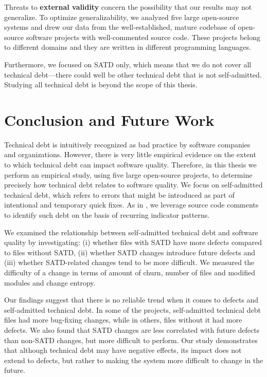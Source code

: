 Threats  to {\bf external validity} concern the possibility that our results may not generalize. To optimize generalizability, we analyzed five large open-source systems and drew our data from the well-established, mature codebase of open-source software projects with well-commented source code. These projects belong to different domains and they are written in different programming languages.


Furthermore, we focused on SATD only, which means that we do not cover all technical debt---there could well be other technical debt that is not self-admitted. Studying all technical debt is beyond the scope of this thesis.





\section{Conclusion and Future Work}
\label{chap3:sec:conclusion}



Technical debt is intuitively recognized as bad practice by software companies and organizations. However, there is very little empirical evidence on the extent to which technical debt can impact software quality. Therefore, in this thesis we perform an empirical study, using five large open-source projects, to determine precisely how technical debt relates to software quality. We focus on self-admitted technical debt, which refers to  errors that might be introduced as part of intentional and temporary quick fixes. As in  \cite{ICSM_PotdarS14}, we leverage source code comments to identify such debt on the basis of recurring indicator patterns.


We examined the relationship between self-admitted technical debt and software quality by investigating: (i) whether files with SATD have more defects compared to files without SATD, (ii) whether SATD changes introduce future defects and (iii) whether SATD-related changes tend to be more difficult. We measured the difficulty of a change in terms of amount of churn, number of files and modified modules and change entropy.




Our findings suggest that there is no reliable trend when it comes to defects and self-admitted technical debt. In some of the projects, self-admitted technical debt files had more bug-fixing changes, while in others, files without it had more defects. We also found that SATD changes are less correlated with future defects than non-SATD changes, but more difficult to perform. 
Our study demonstrates that although technical debt may have negative effects, its impact does not extend to defects, but rather to making the system more difficult to change in the future.

